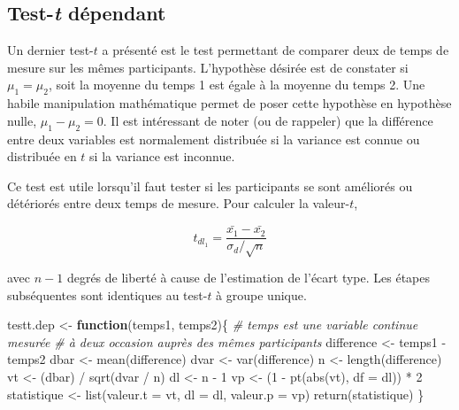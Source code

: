 \documentclass[
]{book}
\newenvironment{Shaded}{}{}
\newcommand{\AttributeTok}[1]{#1}
\newcommand{\CommentTok}[1]{\textit{#1}}
\newcommand{\ControlFlowTok}[1]{\textbf{#1}}
\newcommand{\DecValTok}[1]{#1}
\newcommand{\FunctionTok}[1]{#1}
\newcommand{\NormalTok}[1]{#1}
\newcommand{\OtherTok}[1]{#1}
\newcommand{\SpecialCharTok}[1]{#1}
\begin{document}
\hypertarget{test-t-duxe9pendant}{%
\subsection{\texorpdfstring{Test-\emph{t} dépendant}{Test-t dépendant}}\label{test-t-duxe9pendant}}

Un dernier test-\(t\) a présenté est le test permettant de comparer deux de temps de mesure sur les mêmes participants. L'hypothèse désirée est de constater si \(\mu_1 = \mu_2\), soit la moyenne du temps 1 est égale à la moyenne du temps 2. Une habile manipulation mathématique permet de poser cette hypothèse en hypothèse nulle, \(\mu_1-\mu_2=0\). Il est intéressant de noter (ou de rappeler) que la différence entre deux variables est normalement distribuée si la variance est connue ou distribuée en \(t\) si la variance est inconnue.

Ce test est utile lorsqu'il faut tester si les participants se sont améliorés ou détériorés entre deux temps de mesure. Pour calculer la valeur-\(t\),

\[ t_{dl_1} = \frac{\bar{x_1}-\bar{x_2}}{\sigma_d/\sqrt{n}} \]

avec \(n-1\) degrés de liberté à cause de l'estimation de l'écart type. Les étapes subséquentes sont identiques au test-\(t\) à groupe unique.

\begin{Shaded}
\begin{Highlighting}[]
\NormalTok{testt.dep }\OtherTok{\textless{}{-}} \ControlFlowTok{function}\NormalTok{(temps1, temps2)\{}
  \CommentTok{\# temps est une variable continue mesurée }
  \CommentTok{\# à deux occasion auprès des mêmes participants}
\NormalTok{  difference }\OtherTok{\textless{}{-}}\NormalTok{ temps1 }\SpecialCharTok{{-}}\NormalTok{ temps2}
\NormalTok{  dbar }\OtherTok{\textless{}{-}} \FunctionTok{mean}\NormalTok{(difference)}
\NormalTok{  dvar }\OtherTok{\textless{}{-}} \FunctionTok{var}\NormalTok{(difference)}
\NormalTok{  n }\OtherTok{\textless{}{-}} \FunctionTok{length}\NormalTok{(difference)}
\NormalTok{  vt }\OtherTok{\textless{}{-}}\NormalTok{ (dbar) }\SpecialCharTok{/} \FunctionTok{sqrt}\NormalTok{(dvar }\SpecialCharTok{/}\NormalTok{ n)}
\NormalTok{  dl }\OtherTok{\textless{}{-}}\NormalTok{ n }\SpecialCharTok{{-}} \DecValTok{1}
\NormalTok{  vp }\OtherTok{\textless{}{-}}\NormalTok{ (}\DecValTok{1} \SpecialCharTok{{-}} \FunctionTok{pt}\NormalTok{(}\FunctionTok{abs}\NormalTok{(vt), }\AttributeTok{df =}\NormalTok{ dl)) }\SpecialCharTok{*} \DecValTok{2}
\NormalTok{  statistique }\OtherTok{\textless{}{-}} \FunctionTok{list}\NormalTok{(}\AttributeTok{valeur.t =}\NormalTok{ vt, }\AttributeTok{dl =}\NormalTok{ dl, }\AttributeTok{valeur.p =}\NormalTok{ vp)}
  \FunctionTok{return}\NormalTok{(statistique)}
\NormalTok{\}}
\end{Highlighting}
\end{Shaded}
\end{document}
